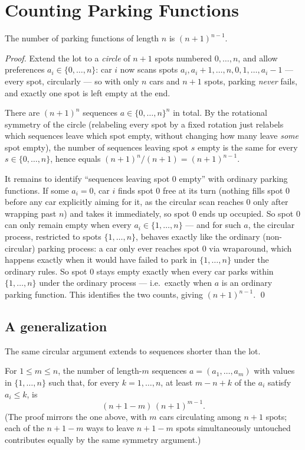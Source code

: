 \documentclass[11pt]{article}
\begin{document}
\section{Counting Parking Functions}
\begin{theorembox}
The number of parking functions of length $n$ is $(n+1)^{n-1}$.

\emph{Proof.} Extend the lot to a \emph{circle} of $n+1$ spots numbered
$0, \ldots, n$, and allow preferences $a_i \in \{0, \ldots, n\}$: car $i$
now scans spots $a_i, a_i{+}1, \ldots, n, 0, 1, \ldots, a_i{-}1$ ---
every spot, circularly --- so with only $n$ cars and $n+1$ spots, parking
\emph{never} fails, and exactly one spot is left empty at the end.

There are $(n+1)^n$ sequences $a \in \{0,\ldots,n\}^n$ in total. By the
rotational symmetry of the circle (relabeling every spot by a fixed
rotation just relabels which sequences leave which spot empty, without
changing how many leave \emph{some} spot empty), the number of sequences
leaving spot $s$ empty is the same for every $s \in \{0,\ldots,n\}$,
hence equals $(n+1)^n / (n+1) = (n+1)^{n-1}$.

It remains to identify ``sequences leaving spot $0$ empty'' with ordinary
parking functions. If some $a_i = 0$, car $i$ finds spot $0$ free at its
turn (nothing fills spot $0$ before any car explicitly aiming for it, as
the circular scan reaches $0$ only after wrapping past $n$) and takes it
immediately, so spot $0$ ends up occupied. So spot $0$ can only remain
empty when every $a_i \in \{1,\ldots,n\}$ --- and for such $a$, the
circular process, restricted to spots $\{1,\ldots,n\}$, behaves exactly
like the ordinary (non-circular) parking process: a car only ever reaches
spot $0$ via wraparound, which happens exactly when it would have failed
to park in $\{1,\ldots,n\}$ under the ordinary rules. So spot $0$ stays
empty exactly when every car parks within $\{1,\ldots,n\}$ under the
ordinary process --- i.e.\ exactly when $a$ is an ordinary parking
function. This identifies the two counts, giving $(n+1)^{n-1}$. \qed
\end{theorembox}

\subsection{A generalization}
The same circular argument extends to sequences shorter than the lot.

\begin{theorembox}
For $1 \le m \le n$, the number of length-$m$ sequences
$a=(a_1,\ldots,a_m)$ with values in $\{1,\ldots,n\}$ such that, for every
$k=1,\ldots,n$, at least $m-n+k$ of the $a_i$ satisfy $a_i \le k$, is
\[
  (n+1-m)\,(n+1)^{m-1}.
\]
(The proof mirrors the one above, with $m$ cars circulating among $n+1$
spots; each of the $n+1-m$ ways to leave $n+1-m$ spots simultaneously
untouched contributes equally by the same symmetry argument.)
\end{theorembox}
\end{document}
